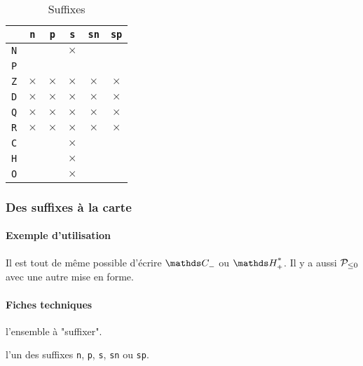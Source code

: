 \documentclass[12pt,a4paper]{article}
\begin{document}
\newcommand\xx{\phantom{$\times$}}
\begin{table}[h]
    \caption{Suffixes}
    \begin{center}
        \begin{tabular}{c|c|c|c|c|c}
              & \verb+n+ & \verb+p+ & \verb+s+ & \verb+sn+ & \verb+sp+ \\
            \hline \verb+N+ & \xx & \xx & $\times$ & \xx & \xx \\
            \hline \verb+P+ & \xx & \xx & \xx & \xx & \xx \\
            \hline \verb+Z+ & $\times$ & $\times$ & $\times$ & $\times$ & $\times$ \\
            \hline \verb+D+ & $\times$ & $\times$ & $\times$ & $\times$ & $\times$ \\
            \hline \verb+Q+ & $\times$ & $\times$ & $\times$ & $\times$ & $\times$ \\
            \hline \verb+R+ & $\times$ & $\times$ & $\times$ & $\times$ & $\times$ \\
            \hline \verb+C+ & \xx & \xx & $\times$ & \xx & \xx \\
            \hline \verb+H+ & \xx & \xx & $\times$ & \xx & \xx \\
            \hline \verb+O+ & \xx & \xx & $\times$ & \xx & \xx \\
        \end{tabular}
    \end{center}
    \label{table:suffixes-sets}
\end{table}




        \subsubsection{Des suffixes à la carte}

            \paragraph{Exemple d'utilisation}

\begin{tcblisting}{}
Il est tout de même possible d'écrire $\specialset{\CC}{n}$ ou $\specialset{\HH}{sp}$.
Il y a aussi $\specialset*{\probaset{P}}{n}$ avec une autre mise en forme.
\end{tcblisting}


            \paragraph{Fiches techniques}



 l'ensemble à "suffixer".

 l'un des suffixes \verb+n+, \verb+p+, \verb+s+, \verb+sn+ ou \verb+sp+.
\end{document}
